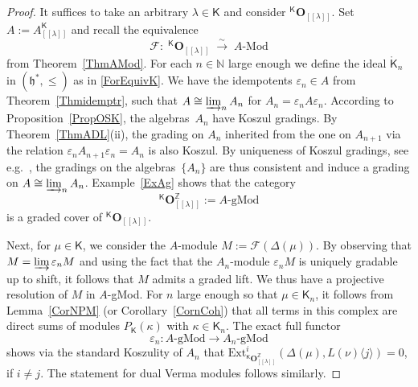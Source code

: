 \documentclass[11pt]{amsart}
\newcommand{\Ffun}{\mathscr{F}}
\newcommand{\lbra}{[\![}
\newcommand{\rbra}{]\!]}
\newcommand{\KKK}{\mathsf{K}}
\newcommand{\bO}{\mathbf{O}}
\newcommand{\Ext}{\mathrm{Ext}}
\newcommand{\fh}{\mathfrak{h}}
\newcommand{\mN}{\mathbb{N}}
\newcommand{\mZ}{\mathbb{Z}}
\numberwithin{equation}{section}
\theoremstyle{plain}
\theoremstyle{remark}
\theoremstyle{remark}
\theoremstyle{construction}
\begin{document}
\begin{proof}
It suffices to take an arbitrary $\lambda\in\KKK$ and {consider} ${}^{\KKK}\bO_{\lbra\lambda\rbra}$.
Set $A:=A^{\KKK}_{\lbra\lambda\rbra}$ and {recall} the equivalence
$$\Ffun:\;{}^{\KKK}\bO_{\lbra\lambda\rbra}\;\stackrel{\sim}{\to}\;A\mbox{-Mod}$$
from Theorem~\ref{ThmAMod}. For each $n\in\mN$ large enough we define the ideal $\mathring{\KKK}_n$ in $(\fh^\ast,\le)$ as in \ref{ForEquivK}.  We have the idempotents $\varepsilon_n\in A$ from Theorem~\ref{Thmidemptr}, {such that $A\cong\varinjlim_n A_n$ for $A_n=\varepsilon_n A\varepsilon_n$}. {According to} Proposition~\ref{PropOSK}, the algebras~$A_n$ have Koszul grading{s}. By Theorem~\ref{ThmADL}(ii), the grading on $A_n$ inherited from the one on  $A_{n+1}$ via the relation $\varepsilon_n A_{n+1}\varepsilon_n=A_n$ is also Koszul. By uniqueness of Koszul gradings, see e.g.~\cite[Corollary~2.5.2]{BGS}, the gradings on the algebras~$\{A_n\}$ are thus consistent and induce a grading on $A\cong\varinjlim_n A_n$. Example~\ref{ExAg} {shows that} the category
$${}^{\KKK}\bO_{\lbra\lambda\rbra}^{\mZ}:=A\mbox{-gMod}$$ is a graded cover of ${}^{\KKK}\bO_{\lbra\lambda\rbra}$.

{Next}, for $\mu\in\KKK$, we consider the $A$-module $M:=\Ffun(\Delta(\mu))$. By observing that $M=\varinjlim \varepsilon_nM$ and using the fact that the $A_n$-module $\varepsilon_nM$ is uniquely gradable up to shift, it follows that $M$ admits a graded lift.
 We thus have a projective resolution of $M$ in $A$-gMod. For $n$ large enough {so} that $\mu\in\KKK_n$, it follows from Lemma~\ref{CorNPM} (or Corollary~\ref{CornCoh}) that all terms in {this} complex are direct sums of modules $P_{\KKK}(\kappa)$ with $\kappa\in \KKK_n$.
The exact full functor
\begin{equation}\label{eqgMod}\varepsilon_n: A\mbox{-gMod}\to A_n\mbox{-gMod}\end{equation}
shows via the standard Koszulity of $A_n$ that $\Ext^i_{{}^{\KKK}\bO_{\lbra\lambda\rbra}^{\mZ}}(\Delta(\mu),L(\nu)\langle j\rangle)=0$, if $i\not=j$. The statement for dual Verma modules follows similarly.
\end{proof}
\end{document}
